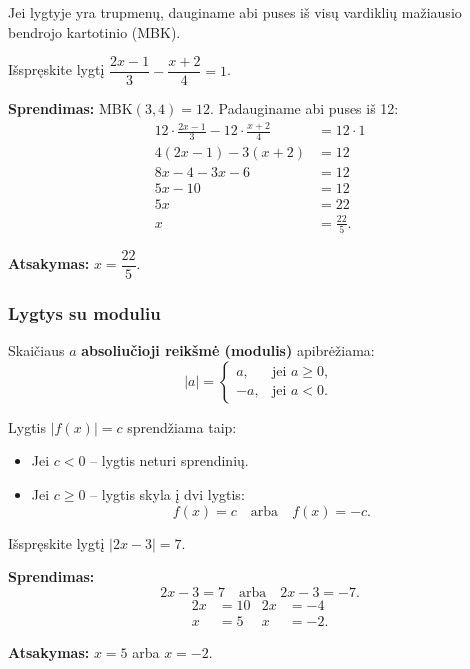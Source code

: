 Jei lygtyje yra trupmenų, dauginame abi puses iš visų vardiklių mažiausio bendrojo kartotinio (MBK).

\begin{example}
Išspręskite lygtį $\dfrac{2x - 1}{3} - \dfrac{x + 2}{4} = 1$.

\textbf{Sprendimas:} MBK$(3, 4) = 12$. Padauginame abi puses iš 12:
\begin{align*}
    12 \cdot \frac{2x-1}{3} - 12 \cdot \frac{x+2}{4} &= 12 \cdot 1 \\
    4(2x - 1) - 3(x + 2) &= 12 \\
    8x - 4 - 3x - 6 &= 12 \\
    5x - 10 &= 12 \\
    5x &= 22 \\
    x &= \frac{22}{5}.
\end{align*}

\textbf{Atsakymas:} $x = \dfrac{22}{5}$.
\end{example}

\subsubsection{Lygtys su moduliu}

\begin{definition}
Skaičiaus $a$ \textbf{absoliučioji reikšmė (modulis)} apibrėžiama:
\[
|a| =
\begin{cases}
    a, & \text{jei } a \geq 0, \\
    -a, & \text{jei } a < 0.
\end{cases}
\]
\end{definition}

Lygtis $|f(x)| = c$ sprendžiama taip:
\begin{itemize}
    \item Jei $c < 0$ – lygtis neturi sprendinių.
    \item Jei $c \geq 0$ – lygtis skyla į dvi lygtis:
    \[
        f(x) = c \quad \text{arba} \quad f(x) = -c.
    \]
\end{itemize}

\begin{example}
Išspręskite lygtį $|2x - 3| = 7$.

\textbf{Sprendimas:}
\[
2x - 3 = 7 \quad \text{arba} \quad 2x - 3 = -7.
\]
\begin{align*}
    2x &= 10 & 2x &= -4 \\
    x &= 5  & x  &= -2.
\end{align*}

\textbf{Atsakymas:} $x = 5$ arba $x = -2$.
\end{example}

